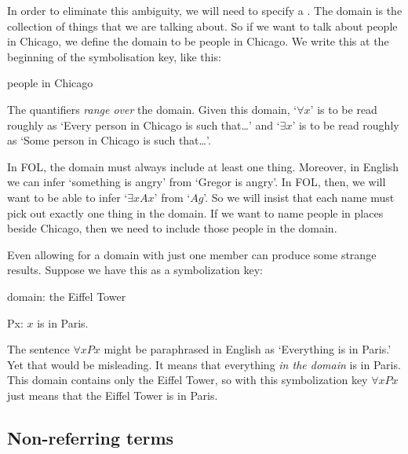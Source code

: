 In order to eliminate this ambiguity, we will need to specify a . The domain is the collection of things that we are talking about. So if we want to talk about people in Chicago, we define the domain to be people in Chicago. We write this at the beginning of the symbolisation key, like this:
	\begin{ekey}
		\item[\text{domain}] people in Chicago
	\end{ekey}
The quantifiers \emph{range over} the domain. Given this domain, `$\forall x$' is to be read roughly as `Every person in Chicago is such that\ldots' and `$\exists x$' is to be read roughly as `Some person in Chicago is such that\ldots'. 


In FOL, the domain must always include at least one thing. Moreover, in English we can infer `something is angry' from `Gregor is angry'. In FOL, then, we will want to be able to infer `$\exists x Ax$' from `$Ag$'. So we will insist that each name must pick out exactly one thing in the domain. If we want to name people in places beside Chicago, then we need to include those people in the domain. 

Even allowing for a domain with just one member can produce some strange results. Suppose we have this as a symbolization key:
\begin{ekey}
\item[domain:] the Eiffel Tower
\item[Px:] $x$ is in Paris.
\end{ekey}
The sentence $\forall x Px$ might be paraphrased in English as `Everything is in Paris.' Yet that would be misleading. It means that everything \emph{in the domain} is in Paris. This domain contains only the Eiffel Tower, so with this symbolization key $\forall x Px$ just means that the Eiffel Tower is in Paris.

\subsection{Non-referring terms}

